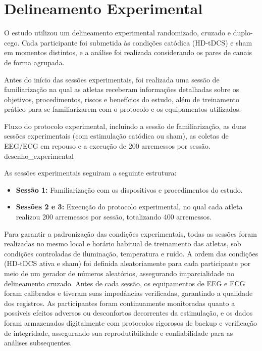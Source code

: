 \section{Delineamento Experimental}

O estudo utilizou um delineamento experimental randomizado, cruzado e duplo-cego. Cada participante foi submetida às condições catódica (HD-tDCS) e sham em momentos distintos, e a análise foi realizada considerando os pares de canais de forma agrupada.

Antes do início das sessões experimentais, foi realizada uma sessão de familiarização na qual as atletas receberam informações detalhadas sobre os objetivos, procedimentos, riscos e benefícios do estudo, além de treinamento prático para se familiarizarem com o protocolo e os equipamentos utilizados.

{Fluxo do protocolo experimental, incluindo a sessão de familiarização, as duas sessões experimentais (com estimulação catódica ou sham), as coletas de EEG/ECG em repouso e a execução de 200 arremessos por sessão.}
{desenho_experimental}


As sessões experimentais seguiram a seguinte estrutura:
\begin{itemize}
    \item \textbf{Sessão 1:} Familiarização com os dispositivos e procedimentos do estudo.
    \item \textbf{Sessões 2 e 3:} Execução do protocolo experimental, no qual cada atleta realizou 200 arremessos por sessão, totalizando 400 arremessos.
\end{itemize}

Para garantir a padronização das condições experimentais, todas as sessões foram realizadas no mesmo local e horário habitual de treinamento das atletas, sob condições controladas de iluminação, temperatura e ruído. A ordem das condições (HD-tDCS ativa e sham) foi definida aleatoriamente para cada participante por meio de um gerador de números aleatórios, assegurando imparcialidade no delineamento cruzado. Antes de cada sessão, os equipamentos de EEG e ECG foram calibrados e tiveram suas impedâncias verificadas, garantindo a qualidade dos registros. As participantes foram continuamente monitoradas quanto a possíveis efeitos adversos ou desconfortos decorrentes da estimulação, e os dados foram armazenados digitalmente com protocolos rigorosos de backup e verificação de integridade, assegurando sua reprodutibilidade e confiabilidade para as análises subsequentes.

